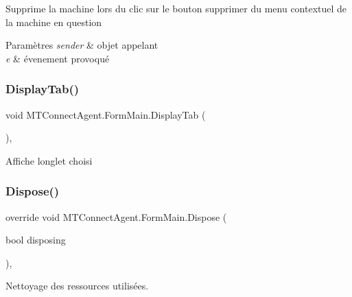 Supprime la machine lors du clic sur le bouton supprimer du menu contextuel de la machine en question 


\begin{DoxyParams}{Paramètres}
{\em sender} & objet appelant\\
\hline
{\em e} & évenement provoqué\\
\hline
\end{DoxyParams}
\mbox{\label{class_m_t_connect_agent_1_1_form_main_aea0155e69bf10a220151c5f3ff4e07c8}} 
\subsubsection{\texorpdfstring{Display\+Tab()}{DisplayTab()}}
{\footnotesize\ttfamily void M\+T\+Connect\+Agent.\+Form\+Main.\+Display\+Tab (\begin{DoxyParamCaption}{ }\end{DoxyParamCaption})\hspace{0.3cm}{\ttfamily [inline]}, {\ttfamily [private]}}



Affiche l\textquotesingle{}onglet choisi 

\mbox{\label{class_m_t_connect_agent_1_1_form_main_a3d1ddf99b2318c689bd65eff1e863445}} 
\subsubsection{\texorpdfstring{Dispose()}{Dispose()}}
{\footnotesize\ttfamily override void M\+T\+Connect\+Agent.\+Form\+Main.\+Dispose (\begin{DoxyParamCaption}\item[{bool}]{disposing }\end{DoxyParamCaption})\hspace{0.3cm}{\ttfamily [inline]}, {\ttfamily [protected]}}



Nettoyage des ressources utilisées. 


